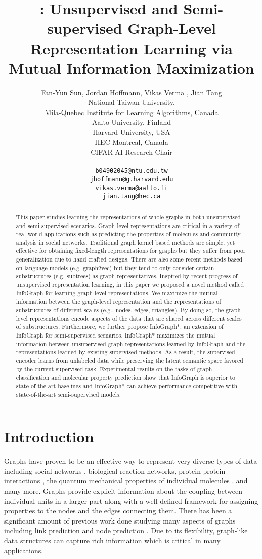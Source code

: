 \documentclass{article} \usepackage{iclr2020_conference,times}
\title{\method{}: Unsupervised and Semi-supervised Graph-Level Representation Learning via Mutual Information Maximization}
\author{Fan-Yun Sun, Jordan Hoffmann, Vikas Verma , Jian Tang\\
National Taiwan University, \\
Mila-Quebec Institute for Learning Algorithms, Canada \\
Aalto University, Finland \\
Harvard University, USA \\
HEC Montreal, Canada \\
CIFAR AI Research Chair\\\\
\texttt{b04902045@ntu.edu.tw}\\
\texttt{jhoffmann@g.harvard.edu}\\
\texttt{vikas.verma@aalto.fi}\\
\texttt{jian.tang@hec.ca}
}
\def\method{InfoGraph}
\begin{document}
\maketitle

\begin{abstract}
This paper studies learning the representations of whole graphs in both unsupervised and semi-supervised scenarios. Graph-level representations are critical in a variety of real-world applications such as predicting the properties of molecules and community analysis in social networks. Traditional graph kernel based methods are simple, yet effective for obtaining fixed-length representations for graphs but they suffer from poor generalization due to hand-crafted designs. There are also some recent methods based on language models (e.g. graph2vec) but they tend to only consider certain substructures (e.g. subtrees) as graph representatives. Inspired by recent progress of unsupervised representation learning, in this paper we proposed a novel method called \method{} for learning graph-level representations. We maximize the mutual information between the graph-level representation and the representations of substructures of different scales (e.g., nodes, edges, triangles).
By doing so, the graph-level representations encode aspects of the data that are shared across different scales of substructures.
Furthermore, we further propose \method{}*, an extension of \method{} for semi-supervised scenarios. \method{}* maximizes the mutual information between unsupervised graph representations learned by \method{} and the representations learned by existing supervised methods.
As a result, the supervised encoder learns from unlabeled data while preserving the latent semantic space favored by the current supervised task. 
Experimental results on the tasks of graph classification and molecular property prediction 
show that \method{} is superior to state-of-the-art baselines and \method{}* can achieve performance competitive with state-of-the-art semi-supervised models.
\end{abstract}

\section{Introduction}


Graphs have proven to be an effective way to represent very diverse types of data including social networks \cite{newman2004finding}, biological reaction networks\cite{pavlopoulos2011using}, protein-protein interactions \cite{krogan2006global}, the quantum mechanical properties of individual molecules \cite{xie2018crystal,jin2018junction}, and many more.  
Graphs provide explicit information about the coupling between individual units in a larger part along with a well defined framework for assigning properties to the nodes and the edges connecting them. 
There has been a significant amount of previous work done studying many aspects of graphs including link prediction \cite{gao2011temporal,wang2011community} and node prediction \cite{blei2003latent}. 
Due to its flexibility, graph-like data structures can capture rich information which is critical in many applications.
\end{document}
